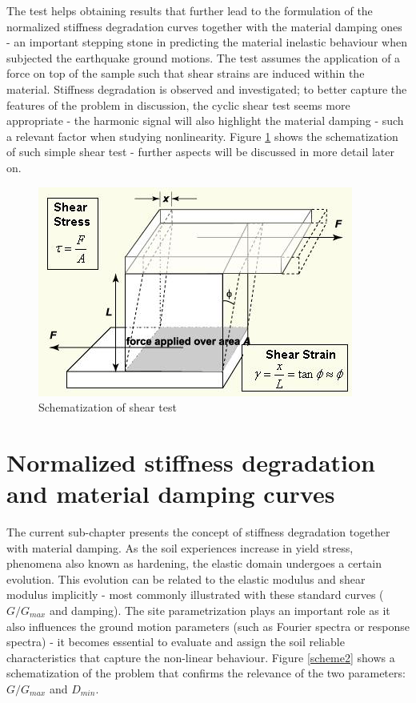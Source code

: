 \documentclass[12pt,a4paper]{report}
\begin{document}
The test helps obtaining results that further lead to the formulation of the normalized stiffness degradation curves together with the material damping ones - an important stepping stone in predicting the material inelastic behaviour when subjected the earthquake ground motions. The test assumes the application of a force on top of the sample such that shear strains are induced within the material. Stiffness degradation is observed and investigated; to better capture the features of the problem in discussion, the cyclic shear test seems more appropriate - the harmonic signal will also highlight the material damping - such a relevant factor when studying nonlinearity. Figure \ref{fig:shear} shows the schematization of such simple shear test - further aspects will be discussed in more detail later on.

\begin{figure}[h!]
	\centering
	\includegraphics[width=0.6\linewidth]{"shear_strain_detail"}
	\caption{Schematization of shear test}
	\label{fig:shear}
\end{figure}

\section{Normalized stiffness degradation and material damping curves}
The current sub-chapter presents the concept of stiffness degradation together with material \mbox{damping}. As the soil experiences increase in yield stress, phenomena also known as hardening, the elastic domain undergoes a certain evolution. This evolution can be related to the elastic modulus and shear modulus implicitly - most commonly illustrated with these standard curves ($G/G_{max}$ and damping). The site parametrization plays an important role as it also influences the ground motion parameters (such as Fourier spectra or response spectra) - it becomes essential to evaluate and assign the soil reliable characteristics that capture the non-linear behaviour. Figure \ref{scheme2} shows a schematization of the problem that confirms the relevance of the two parameters: $G/G_{max}$ and $D_{min}$.
\end{document}
